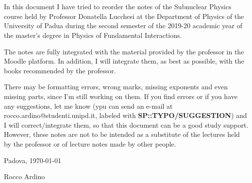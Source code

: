 \chapter*{}
\noindent In this document I have tried to reorder the notes of the Subnuclear Physics course held by Professor Donatella Lucchesi at the Department of Physics of the University of Padua during the second semester of the 2019-20 academic year of the master's degree in Physics of Fundamental Interactions.

The notes are fully integrated with the material provided by the professor in the Moodle platform. In addition, I will integrate them, as best as possible, with the books recommended by the professor.

There may be formatting errors, wrong marks, missing exponents and even missing parts, since I'm still working on them. If you find errors or if you have any suggestions, let me know (ypu can send an e-mail at rocco.ardino@studenti.unipd.it, labeled with \textbf{SP::TYPO/SUGGESTION}) and I will correct/integrate them, so that this document can be a good study support. However, these notes are not to be intended as a substitute of the lectures held by the professor or of lecture notes made by other people.

\vspace{1cm}
\noindent \hfill Padova, \today

\hfill Rocco Ardino
